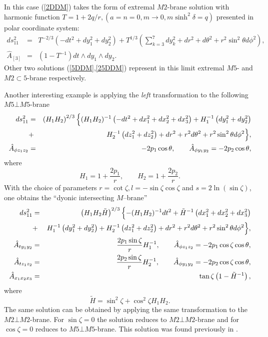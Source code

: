 \documentclass[a4paper,12pt]{article}
\begin{document}
In this case (\ref{2DDM}) takes the form of extremal $M2$-brane
solution with harmonic function $T=1+2q/r, (a=n=0, m\to 0,
m\sinh^2\delta=q)$ presented in polar coordinate system:
\begin{eqnarray}
ds_{11}^2 &=& T^{-2/3}(-dt^2+dy_1^2+dy_2^2) + T^{1/3} \left(
\sum_{k=3}^7 dy_k^2 + dr^2 + d\theta^2 + r^2 \sin^2\theta d\phi^2
\right), \nonumber\\
\hat A_{[3]} &=& (1-T^{-1}) dt \wedge dy_1 \wedge dy_2.
\end{eqnarray}
Other two solutions (\ref{5DDM},\ref{25DDM}) represent in this
limit extremal $M5$- and $M2\subset 5$-brane respectively.

Another interesting example is applying the {\em left}
transformation to the following $M5\bot M5$-brane
\begin{eqnarray}
ds_{11}^2 &=& \left( H_1 H_2 \right)^{2/3} \Bigl\{ (H_1 H_2)^{-1}
\left( -dt^2+dx_1^2+dx_2^2+dx_3^2 \right)
+ H_1^{-1} \left( dy_1^2+dy_2^2 \right) \nonumber\\
&+& H_2^{-1} \left( dz_1^2+dz_2^2 \right) + dr^2 + r^2 d\theta^2
+ r^2\sin^2\theta d\phi^2 \Bigr\}, \nonumber\\
\hat A_{\phi z_1z_2} &=& -2 p_1 \cos\theta, \qquad \hat A_{\phi
y_1y_2} = -2 p_2 \cos\theta,
\end{eqnarray}
where
\begin{equation}
H_1 = 1 + \frac{2p_1}r, \qquad H_2 = 1 + \frac{2p_2}r.
\end{equation}
With the choice of parameters $r=\cot\zeta,
l=-\sin\zeta\cos\zeta$ and $s=2 \ln(\sin\zeta)$, one obtains the
``dyonic intersecting $M$--brane''
\begin{eqnarray}
ds_{11}^2 &=& \left( H_1 H_2 \tilde H \right)^{2/3} \Bigl\{ - (H_1
H_2)^{-1} dt^2 + \tilde H^{-1} \left( dx_1^2+dx_2^2+dx_3^2
\right)\nonumber \\
&+& H_1^{-1} \left( dy_1^2+dy_2^2 \right) + H_2^{-1} \left(
dz_1^2+dz_2^2 \right) + dr^2 + r^2 d\theta^2 + r^2\sin^2\theta
d\phi^2 \Bigr\}, \nonumber\\
\hat A_{ty_1y_2} &=& \frac{2p_1\sin\zeta}r H_1^{-1}, \qquad
\hat A_{\phi z_1z_2} = -2 p_1 \cos\zeta \cos\theta, \nonumber\\
\hat A_{tz_1z_2} &=& \frac{2p_2\sin\zeta}r H_2^{-1}, \qquad
\hat A_{\phi y_1y_2} = -2 p_2 \cos\zeta \cos\theta, \nonumber\\
\hat A_{x_1x_2x_3} &=& \tan\zeta \left( 1-\tilde H^{-1} \right),
\end{eqnarray}
where
\begin{equation}
\tilde H = \sin^2\zeta + \cos^2\zeta H_1 H_2.
\end{equation}
The same solution can be obtained by applying the same
transformation to the $M2\bot M2$-brane. For $\sin\zeta=0$ the
solution reduces to $M2\bot M2$-brane and for $\cos\zeta=0$
reduces to $M5\bot M5$-brane. This solution was found previously
in \cite{Co97}.
\end{document}

